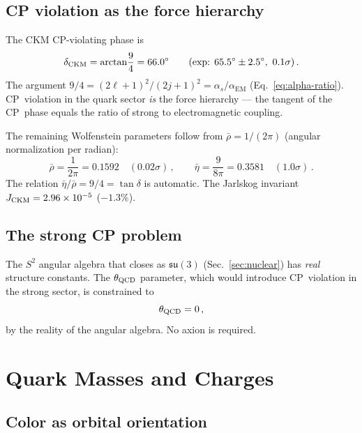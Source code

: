 \documentclass[aps,prd,twocolumn,superscriptaddress,nofootinbib,longbibliography]{revtex4-2}
\newcommand{\aEM}{\alpha_{\mathrm{EM}}}
\begin{document}
\subsection{CP violation as the force hierarchy}

The CKM CP-violating phase is
\begin{equation}\label{eq:delta-ckm}
  \delta_{\rm CKM} = \arctan\!\frac{9}{4}
  = 66.0^\circ
  \qquad(\text{exp: }65.5^\circ \pm 2.5^\circ,\ 0.1\sigma)\,.
\end{equation}
The argument $9/4 = (2\ell+1)^2/(2j+1)^2 = \alpha_s/\aEM$
(Eq.~\ref{eq:alpha-ratio}).  CP~violation in the quark sector
\emph{is} the force hierarchy --- the tangent of the CP~phase equals
the ratio of strong to electromagnetic coupling.

The remaining Wolfenstein parameters follow from $\bar\rho = 1/(2\pi)$
(angular normalization per radian):
\begin{equation}
  \bar\rho = \frac{1}{2\pi} = 0.1592
  \quad(0.02\sigma)\,,
  \qquad
  \bar\eta = \frac{9}{8\pi} = 0.3581
  \quad(1.0\sigma)\,.
\end{equation}
The relation $\bar\eta/\bar\rho = 9/4 = \tan\delta$ is automatic.
The Jarlskog invariant
$J_{\rm CKM} = 2.96 \times 10^{-5}$ ($-1.3\%$).

\subsection{The strong CP problem}

The $S^2$ angular algebra that closes as $\mathfrak{su}(3)$
(Sec.~\ref{sec:nuclear}) has \emph{real} structure constants.
The $\theta_{\rm QCD}$ parameter, which would introduce CP~violation
in the strong sector, is constrained to
\begin{equation}
  \theta_{\rm QCD} = 0\,,
\end{equation}
by the reality of the angular algebra.  No axion is required.

\section{Quark Masses and Charges}\label{sec:quarks}

\subsection{Color as orbital orientation}
\end{document}
